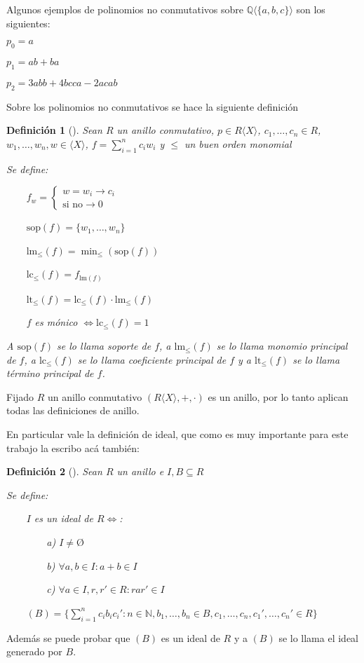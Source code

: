 \documentclass{amsbook}
\theoremstyle{customstyle}
\newtheorem{definition}{Definición}[section]
\newcommand{\definición}[2][]{
  \begin{definition}[#1]
  \setlength{\parindent}{2em} %
  #2
  \end{definition}
}
\begin{document}
Algunos ejemplos de polinomios no conmutativos sobre $ℚ⟨\{a, b, c\}⟩$ son los siguientes:

$p_0 = a$

$p_1 = ab + ba$

$p_2 = 3 abb + 4 bcca - 2 acab$

Sobre los polinomios no conmutativos se hace la siguiente definición

\definición[] {
Sean $R$ un anillo conmutativo, $p ∈ R⟨X⟩$, $c_1, …, c_n ∈ R$, $w_1, …, w_n, w ∈ ⟨X⟩$, $f = \sum_{i = 1}^n c_i w_i$ y $≤$ un buen orden monomial

Se define:

    $f_w = \left\{\begin{array}{ll} w = w_i → c_i \\ \text{si no} → 0  \end{array} \right. $

    $\text{sop}(f) = \{w_1, …, w_n\}$

    $\text{lm}_≤(f) = \min_≤(\text{sop}(f))$

    $\text{lc}_≤(f) = f_{\text{lm}(f)}$

    $\text{lt}_≤(f) = \text{lc}_≤(f) · \text{lm}_≤(f)$

    $f$ es mónico $⇔ \text{lc}_≤(f) = 1$

A $\text{sop}(f)$ se lo llama soporte de $f$, a $\text{lm}_≤(f)$ se lo llama monomio principal de $f$, a $\text{lc}_≤(f)$ se lo llama coeficiente principal de $f$ y a $\text{lt}_≤(f)$ se lo llama término principal de $f$.

}

Fijado $R$ un anillo conmutativo $(R⟨X⟩, +, ·)$ es un anillo, por lo tanto aplican todas las definiciones de anillo.

En particular vale la definición de ideal, que como es muy importante para este trabajo la escribo acá también:

\definición[] {
Sean $R$ un anillo e $I, B ⊆ R$

Se define:

    $I$ es un ideal de $R ⇔$:

        a) $I ≠ Ø$

        b) $∀a, b ∈ I : a + b ∈ I$

        c) $∀a ∈ I, r, r' ∈ R : rar' ∈ I$

    $(B) = \{\sum_{i = 1}^n c_i b_i c_i' : n ∈ ℕ, b_1, …, b_n ∈ B, c_1, …, c_n, c_1', …, c_n' ∈ R\}$
}

Además se puede probar que $(B)$ es un ideal de $R$ y a $(B)$ se lo llama el ideal generado por $B$.
\end{document}
